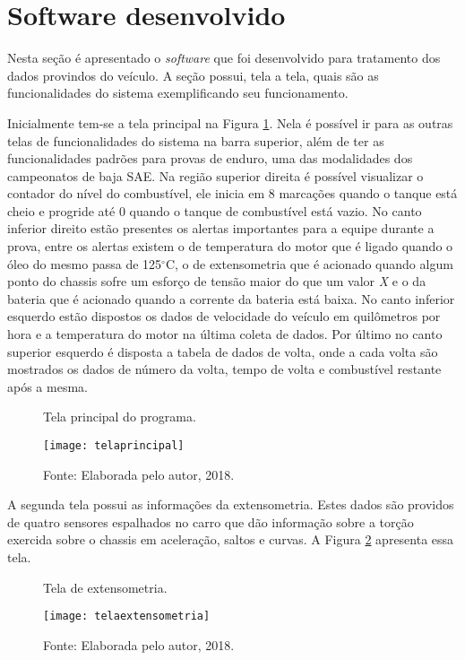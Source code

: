 \section {Software desenvolvido}
Nesta seção é apresentado o \textit{software} que foi desenvolvido para tratamento dos dados provindos do veículo. A seção possui, tela a tela, quais são as funcionalidades do sistema exemplificando seu funcionamento.

Inicialmente tem-se a tela principal na Figura \ref{fig:telaprincipal}. Nela é possível ir para as outras telas de funcionalidades do sistema na barra superior, além de ter as funcionalidades padrões para provas de enduro, uma das modalidades dos campeonatos de baja SAE. Na região superior direita é possível visualizar o contador do nível do combustível, ele inicia em 8 marcações quando o tanque está cheio e progride até 0 quando o tanque de combustível está vazio. No canto inferior direito estão presentes os alertas importantes para a equipe durante a prova, entre os alertas existem o de temperatura do motor que é ligado quando o óleo do mesmo passa de 125$^\circ$C, o de extensometria que é acionado quando algum ponto do chassis sofre um esforço de tensão maior do que um valor \textit{X} e o da bateria que é acionado quando a corrente da bateria está baixa. No canto inferior esquerdo estão dispostos os dados de velocidade do veículo em quilômetros por hora e a temperatura do motor na última coleta de dados. Por último no canto superior esquerdo é disposta a tabela de dados de volta, onde a cada volta são mostrados os dados de número da volta, tempo de volta e combustível restante após a mesma. 

\begin{figure}[!htb]
	\centering
		\caption{Tela principal do programa.}
		\texttt{[image: telaprincipal]} 
		\caption*{Fonte: Elaborada pelo autor, 2018.}
		\label{fig:telaprincipal}
\end{figure}    

A segunda tela possui as informações da extensometria. Estes dados são providos de quatro sensores espalhados no carro que dão informação sobre a torção exercida sobre o chassis em aceleração, saltos e curvas. A Figura \ref{fig:telaextensometria} apresenta essa tela.

\begin{figure}[!htb]
	\centering
		\caption{Tela de extensometria.}
		\texttt{[image: telaextensometria]} 
		\caption*{Fonte: Elaborada pelo autor, 2018.}
		\label{fig:telaextensometria}
\end{figure}    


